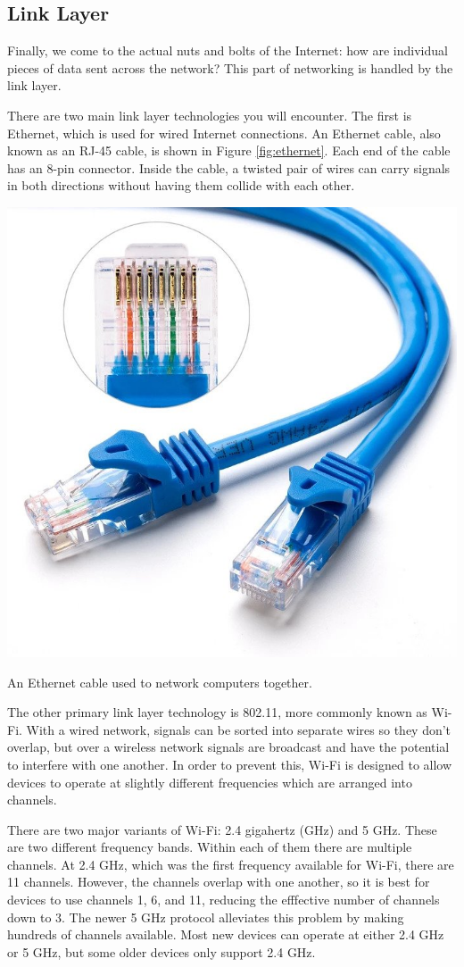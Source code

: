 \subsection{Link Layer}

Finally, we come to the actual nuts and bolts of the Internet: how are individual pieces of data sent across the network? This part of networking is handled by the link layer.

There are two main link layer technologies you will encounter. The first is Ethernet, which is used for wired Internet connections. An Ethernet cable, also known as an RJ-45 cable, is shown in Figure \ref{fig:ethernet}. Each end of the cable has an 8-pin connector. Inside the cable, a twisted pair of wires can carry signals in both directions without having them collide with each other.

\begin{marginfigure}
    \centering
    \includegraphics[width=.6\linewidth]{images/ethernet.jpg}
    \caption{An Ethernet cable used to network computers together.}
    \label{fig:ethernet}
\end{marginfigure}

The other primary link layer technology is 802.11, more commonly known as Wi-Fi. With a wired network, signals can be sorted into separate wires so they don't overlap, but over a wireless network signals are broadcast and have the potential to interfere with one another. In order to prevent this, Wi-Fi is designed to allow devices to operate at slightly different frequencies which are arranged into channels.

There are two major variants of Wi-Fi: 2.4 gigahertz (GHz) and 5 GHz. These are two different frequency bands. Within each of them there are multiple channels. At 2.4 GHz, which was the first frequency available for Wi-Fi, there are 11 channels. However, the channels overlap with one another, so it is best for devices to use channels 1, 6, and 11, reducing the efffective number of channels down to 3. The newer 5 GHz protocol alleviates this problem by making hundreds of channels available. Most new devices can operate at either 2.4 GHz or 5 GHz, but some older devices only support 2.4 GHz.


